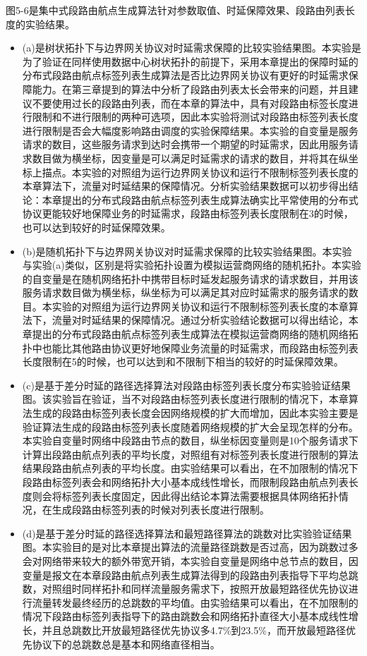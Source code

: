 图5-6是集中式段路由航点生成算法针对参数取值、时延保障效果、段路由列表长度的实验结果。

\begin{itemize}
\item (a)是树状拓扑下与边界网关协议对时延需求保障的比较实验结果图。本实验是为了验证在同样使用数据中心树状拓扑的前提下，采用本章提出的保障时延的分布式段路由航点标签列表生成算法是否比边界网关协议有更好的时延需求保障能力。在第三章提到的算法中分析了段路由列表太长会带来的问题，并且建议不要使用过长的段路由列表，而在本章的算法中，具有对段路由标签长度进行限制和不进行限制的两种可选项，因此本实验将测试对段路由标签列表长度进行限制是否会大幅度影响路由调度的实验保障结果。本实验的自变量是服务请求的数目，这些服务请求到达时会携带一个期望的时延需求，因此用服务请求数目做为横坐标，因变量是可以满足时延需求的请求的数目，并将其在纵坐标上描点。本实验的对照组为运行边界网关协议和运行不限制标签列表长度的本章算法下，流量对时延结果的保障情况。分析实验结果数据可以初步得出结论：本章提出的分布式段路由航点标签列表生成算法确实比平常使用的分布式协议更能较好地保障业务的时延需求，段路由标签列表长度限制在3的时候，也可以达到较好的时延保障效果。
\item (b)是随机拓扑下与边界网关协议对时延需求保障的比较实验结果图。本实验与实验(a)类似，区别是将实验拓扑设置为模拟运营商网络的随机拓扑。本实验的自变量是在随机网络拓扑中携带目标时延发起服务请求的请求数目，并用该服务请求数目做为横坐标，纵坐标为可以满足其对应时延需求的服务请求的数目。本实验的对照组为运行边界网关协议和运行不限制标签列表长度的本章算法下，流量对时延结果的保障情况。通过分析实验结论数据可以得出结论，本章提出的分布式段路由航点标签列表生成算法在模拟运营商网络的随机网络拓扑中也能比其他路由协议更好地保障业务流量的时延需求，而段路由标签列表长度限制在5的时候，也可以达到和不限制下相当的较好的时延保障效果。
\item (c)是基于差分时延的路径选择算法对段路由标签列表长度分布实验验证结果图。该实验旨在验证，当不对段路由标签列表长度进行限制的情况下，本章算法生成的段路由标签列表长度会因网络规模的扩大而增加，因此本实验主要是验证算法生成的段路由标签列表长度随着网络规模的扩大会呈现怎样的分布。本实验自变量时网络中段路由节点的数目，纵坐标因变量则是10个服务请求下计算出段路由航点列表的平均长度，对照组有对标签列表长度进行限制的算法结果段路由航点列表的平均长度。由实验结果可以看出，在不加限制的情况下段路由标签列表会和网络拓扑大小基本成线性增长，而限制段路由航点列表长度则会将标签列表长度固定，因此得出结论本算法需要根据具体网络拓扑情况，在生成段路由标签列表的时候对列表长度进行限制。
\item (d)是基于差分时延的路径选择算法和最短路径算法的跳数对比实验验证结果图。本实验目的是对比本章提出算法的流量路径跳数是否过高，因为跳数过多会对网络带来较大的额外带宽开销，本实验自变量是网络中总节点的数目，因变量是报文在本章段路由航点列表生成算法得到的段路由列表指导下平均总跳数，对照组时同样拓扑和同样流量服务需求下，按照开放最短路径优先协议进行流量转发最终经历的总跳数的平均值。由实验结果可以看出，在不加限制的情况下段路由标签列表指导下的路由跳数会和网络拓扑直径大小基本成线性增长，并且总跳数比开放最短路径优先协议多4.7\%到23.5\%，而开放最短路径优先协议下的总跳数总是基本和网络直径相当。
\end{itemize}

